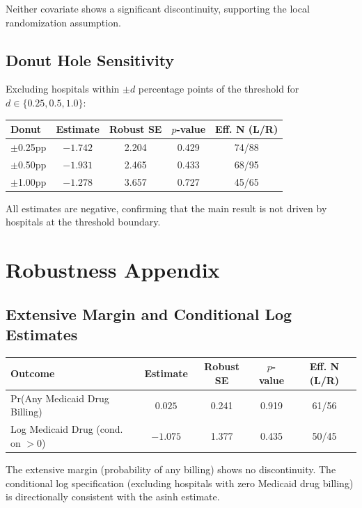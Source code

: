 \documentclass[12pt]{article}
\begin{document}
Neither covariate shows a significant discontinuity, supporting the local randomization assumption.

\subsection{Donut Hole Sensitivity}

Excluding hospitals within $\pm d$ percentage points of the threshold for $d \in \{0.25, 0.5, 1.0\}$:

\begin{table}[H]
\centering
\begin{tabular}{lcccc}
\toprule
Donut & Estimate & Robust SE & $p$-value & Eff. N (L/R) \\
\midrule
$\pm$0.25pp & $-1.742$ & 2.204 & 0.429 & 74/88 \\
$\pm$0.50pp & $-1.931$ & 2.465 & 0.433 & 68/95 \\
$\pm$1.00pp & $-1.278$ & 3.657 & 0.727 & 45/65 \\
\bottomrule
\end{tabular}
\end{table}

All estimates are negative, confirming that the main result is not driven by hospitals at the threshold boundary.

\section{Robustness Appendix}
\label{app:robust}

\subsection{Extensive Margin and Conditional Log Estimates}

\begin{table}[H]
\centering
\begin{tabular}{lcccc}
\toprule
Outcome & Estimate & Robust SE & $p$-value & Eff. N (L/R) \\
\midrule
Pr(Any Medicaid Drug Billing) & $0.025$ & 0.241 & 0.919 & 61/56 \\
Log Medicaid Drug (cond. on $>$0) & $-1.075$ & 1.377 & 0.435 & 50/45 \\
\bottomrule
\end{tabular}
\end{table}

The extensive margin (probability of any billing) shows no discontinuity. The conditional log specification (excluding hospitals with zero Medicaid drug billing) is directionally consistent with the asinh estimate.
\end{document}
